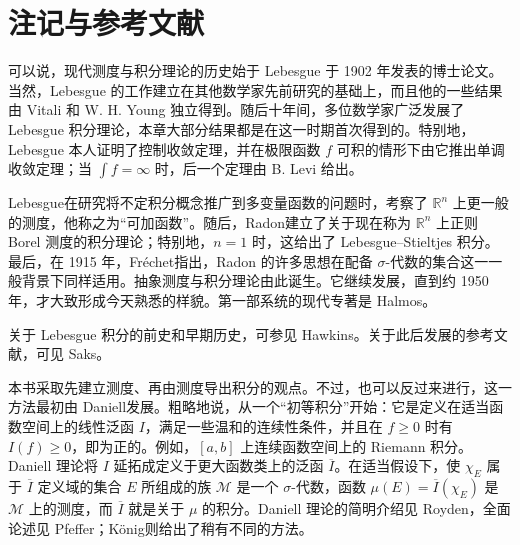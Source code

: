\documentclass[../../main.tex]{subfiles}%
\begin{document}
\section{注记与参考文献}\label{section:ch02-notes-references}
可以说，现代测度与积分理论的历史始于 Lebesgue 于 1902 年发表的博士论文\cite{folland-bib-091}。当然，Lebesgue 的工作建立在其他数学家先前研究的基础上，而且他的一些结果由 Vitali 和 W. H. Young 独立得到。随后十年间，多位数学家广泛发展了 Lebesgue 积分理论，本章大部分结果都是在这一时期首次得到的。特别地，Lebesgue 本人证明了控制收敛定理，并在极限函数 $f$ 可积的情形下由它推出单调收敛定理；当 $\int f=\infty$ 时，后一个定理由 B. Levi 给出。

Lebesgue\cite{folland-bib-092}在研究将不定积分概念推广到多变量函数的问题时，考察了 $\mathbb{R}^n$ 上更一般的测度，他称之为“可加函数”。随后，Radon\cite{folland-bib-111}建立了关于现在称为 $\mathbb{R}^n$ 上正则 Borel 测度的积分理论；特别地，$n=1$ 时，这给出了 Lebesgue–Stieltjes 积分。最后，在 1915 年，Fréchet\cite{folland-bib-053}指出，Radon 的许多思想在配备 $\sigma$-代数的集合这一一般背景下同样适用。抽象测度与积分理论由此诞生。它继续发展，直到约 1950 年，才大致形成今天熟悉的样貌。第一部系统的现代专著是 Halmos\cite{folland-bib-061}。

关于 Lebesgue 积分的前史和早期历史，可参见 Hawkins\cite{folland-bib-070}。关于此后发展的参考文献，可见 Saks\cite{folland-bib-128}。

本书采取先建立测度、再由测度导出积分的观点。不过，也可以反过来进行，这一方法最初由 Daniell\cite{folland-bib-029}发展。粗略地说，从一个“初等积分”开始：它是定义在适当函数空间上的线性泛函 $I$，满足一些温和的连续性条件，并且在 $f\ge0$ 时有 $I(f)\ge0$，即为正的。例如，$[a,b]$ 上连续函数空间上的 Riemann 积分。Daniell 理论将 $I$ 延拓成定义于更大函数类上的泛函 $\overline I$。在适当假设下，使 $\chi_E$ 属于 $\overline I$ 定义域的集合 $E$ 所组成的族 $\mathscr{M}$ 是一个 $\sigma$-代数，函数 $\mu(E)=\overline I(\chi_E)$ 是 $\mathscr{M}$ 上的测度，而 $\overline I$ 就是关于 $\mu$ 的积分。Daniell 理论的简明介绍见 Royden\cite{folland-bib-121}，全面论述见 Pfeffer\cite{folland-bib-108}；König\cite{folland-bib-086}则给出了稍有不同的方法。
\end{document}
